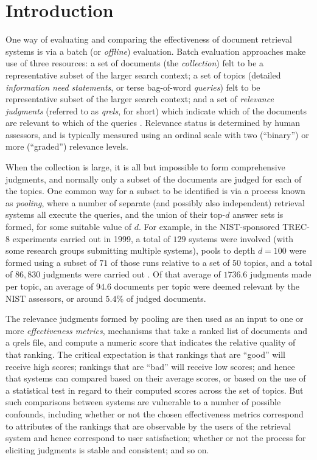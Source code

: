 \section{Introduction}
\label{sec-intro}

One way of evaluating and comparing the effectiveness of document
retrieval systems is via a batch (or {\emph{offline}}) evaluation.
Batch evaluation approaches make use of three resources: a set of
documents (the {\emph{collection}}) felt to be a representative
subset of the larger search context; a set of topics (detailed
{\emph{information need statements}}, or terse bag-of-word
{\emph{queries}}) felt to be representative subset of the larger
search context; and a set of {\emph{relevance judgments}} (referred
to as {\emph{qrels}}, for short) which indicate which of the
documents are relevant to which of the queries
{\citep{sanderson10fntir}}.
Relevance status is determined by human assessors, and is typically
measured using an ordinal scale with two (``binary'') or more
(``graded'') relevance levels.

When the collection is large, it is all but impossible to form
comprehensive judgments, and normally only a subset of the documents
are judged for each of the topics.
One common way for a subset to be identified is via a process known
as {\emph{pooling}}, where a number of separate (and possibly also
independent) retrieval systems all execute the queries, and the union
of their top-$d$ answer sets is formed, for some suitable value of $d$.
For example, in the NIST-sponsored TREC-8 experiments carried out in
1999, a total of $129$ systems
were involved (with some research groups submitting multiple
systems), pools to depth $d=100$ were formed using a subset of $71$
of those runs relative to a set of $50$ topics, and a total of
$86{,}830$ judgments were carried out {\cite{vh99trec}}.
Of that average of $1736.6$ judgments made per topic, an average of
$94.6$ documents per topic were deemed relevant by the NIST
assessors, or around $5.4$\% of judged documents.

The relevance judgments formed by pooling are then used as an input
to one or more {\emph{effectiveness metrics}}, mechanisms that take a
ranked list of documents and a qrels file, and compute a numeric
score that indicates the relative quality of that ranking.
The critical expectation is that rankings that are ``good'' will
receive high scores; rankings that are ``bad'' will receive low
scores; and hence that systems can compared based on their average
scores, or based on the use of a statistical test in regard to their
computed scores across the set of topics.
But such comparisons between systems are vulnerable to a number of
possible confounds, including whether or not the chosen effectiveness
metrics correspond to attributes of the rankings that are observable
by the users of the retrieval system and hence correspond to user
satisfaction; whether or not the process for eliciting judgments is
stable and consistent; and so on.

